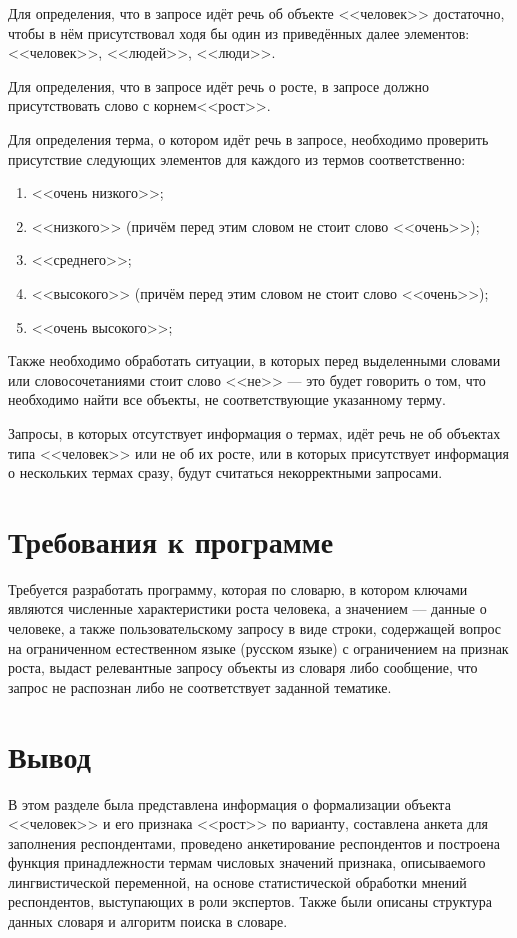 Для определения, что в запросе идёт речь об объекте <<человек>> достаточно, чтобы в нём присутствовал ходя бы один из приведённых далее элементов: <<человек>>, <<людей>>, <<люди>>.

Для определения, что в запросе идёт речь о росте, в запросе должно присутствовать слово с корнем<<рост>>.

Для определения терма, о котором идёт речь в запросе, необходимо проверить присутствие следующих элементов для каждого из термов соответственно:\newline
\begin{enumerate}[label=\arabic*)]
	\item <<очень низкого>>;
	\item <<низкого>> (причём перед этим словом не стоит слово <<очень>>);
	\item <<среднего>>;
	\item <<высокого>> (причём перед этим словом не стоит слово <<очень>>);
	\item <<очень высокого>>;
\end{enumerate}

Также необходимо обработать ситуации, в которых перед выделенными словами или словосочетаниями стоит слово <<не>> --- это будет говорить о том, что необходимо найти все объекты, не соответствующие указанному терму.

Запросы, в которых отсутствует информация о термах, идёт речь не об объектах типа <<человек>> или не об их росте, или в которых присутствует информация о нескольких термах сразу, будут считаться некорректными запросами.


\section{Требования к программе}
Требуется разработать программу, которая по словарю, в котором ключами являются численные характеристики роста человека, а значением --- данные о человеке, а также пользовательскому запросу в виде строки, содержащей вопрос на ограниченном естественном языке (русском языке) с ограничением на признак роста, выдаст релевантные запросу объекты из словаря либо сообщение, что запрос не распознан либо не соответствует заданной тематике.

\section*{Вывод}

В этом разделе была представлена информация о формализации объекта <<человек>> и его признака <<рост>> по варианту, составлена анкета для заполнения респондентами, проведено анкетирование респондентов и построена функция принадлежности термам числовых значений признака, описываемого лингвистической переменной, на основе статистической обработки мнений респондентов, выступающих в роли экспертов.
Также были описаны структура данных словаря и алгоритм поиска в словаре. 
